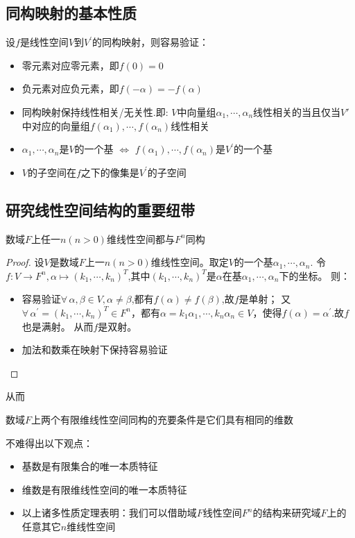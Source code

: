 \subsection*{同构映射的基本性质}
\begin{property}
    设$f$是线性空间$V$到$V^{'}$的同构映射，则容易验证：
    \begin{itemize}
        \item 零元素对应零元素，即$f(0) = 0$
        \item 负元素对应负元素，即$f(-\alpha) = -f(\alpha)$
        \item 同构映射保持线性相关/无关性.即:
        $V$中向量组$\alpha_1, \cdots, \alpha_n$线性相关的当且仅当$V'$中对应的向量组$f(\alpha_1), \cdots, f(\alpha_n)$线性相关
        \item $\alpha_1, \cdots, \alpha_n$是$V$的一个基 $\Leftrightarrow$ $f(\alpha_1), \cdots, f(\alpha_n)$是$V^{'}$的一个基
        \item $V$的子空间在$f$之下的像集是$V^{'}$的子空间
    \end{itemize}
\end{property}

\subsection*{研究线性空间结构的重要纽带}
\begin{theorem}
    数域$F$上任一$n(n > 0)$维线性空间都与$F^n$同构
\end{theorem}

\begin{proof}
    设$V$是数域$F$上一$n(n > 0)$维线性空间。取定$V$的一个基$\alpha_1, \cdots, \alpha_n$.
    令$f:V \to F^n, \alpha \mapsto (k_1, \cdots, k_n)^T$,其中$(k_1, \cdots, k_n)^T$是$\alpha$在基$\alpha_1, \cdots, \alpha_n$下的坐标。
    则：
    \begin{itemize}
        \item 容易验证$\forall \, \alpha, \beta \in V, \alpha \neq \beta$,都有$f(\alpha) \neq f(\beta)$,故$f$是单射；
        又$\forall \, \alpha^{'} = (k_1, \cdots, k_n)^T \in F^n$，都有$\alpha = k_1\alpha_1, \cdots, k_n\alpha_n \in V$，使得$f(\alpha) = \alpha^{'}$.故$f$也是满射。
        从而$f$是双射。
        \item 加法和数乘在映射下保持容易验证
    \end{itemize}
\end{proof}

从而
\begin{theorem}
    数域$F$上两个有限维线性空间同构的充要条件是它们具有相同的维数
\end{theorem}
不难得出以下观点：
\begin{itemize}
    \item 基数是有限集合的唯一本质特征
    \item 维数是有限维线性空间的唯一本质特征
    \item 以上诸多性质定理表明：我们可以借助域$F$线性空间$F^n$的结构来研究域$F$上的任意其它$n$维线性空间
\end{itemize}
